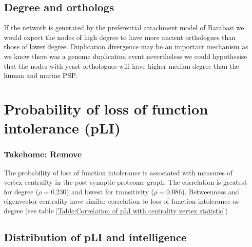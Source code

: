 



\subsection{Degree and orthologs}

If the network is generated by the preferential attachment model of Barabasi we would expect the nodes of high degree to have more ancient orthologues than those of lower degree.  Duplication divergence  may be an important mechanism as we know there was a genome duplication event nevertheless we could hypothesise that the nodes with yeast orthologues will have higher median degree than the human and murine PSP. 

\section{Probability of loss of function intolerance (pLI)}

 \subsubsection{Takehome: Remove}

The probability of loss of function intolerance is associated with measures of vertex centrality in the post synaptic proteome graph. The correlation is greatest for degree ($\rho=0.230$) and lowest for transitivity ($\rho=0.086$). Betweenness and eigenvector centrality have similar correlation to loss of function intolerance as degree (see table \ref{Table:Correlation of pLI with centrality vertex statistic})



\subsection{Distribution of pLI and intelligence}


